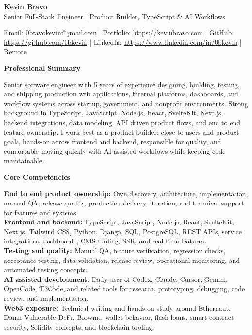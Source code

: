\documentclass[11pt]{article}
\begin{document}
\raggedright

\begin{center}
    {\LARGE \textbf{Kevin Bravo}}\\
    Senior Full-Stack Engineer | Product Builder, TypeScript \& AI Workflows \\
    \hrulefill
\end{center}

\begin{center}
    Email: \href{mailto:0bravokevin@gmail.com}{0bravokevin@gmail.com}
    | Portfolio: \href{https://kevinbravo.com}{https://kevinbravo.com}
    | GitHub: \href{https://github.com/0bkevin}{https://github.com/0bkevin}
    | LinkedIn: \href{https://www.linkedin.com/in/0bkevin/}{https://www.linkedin.com/in/0bkevin}
    | Remote
\end{center}

\vspace{4pt}
\begin{center}
    \textbf{Professional Summary}
\end{center}
\vspace{-4pt}
Senior software engineer with 5 years of experience designing, building, testing, and shipping production web applications, internal platforms, dashboards, and workflow systems across startup, government, and nonprofit environments. Strong background in TypeScript, JavaScript, Node.js, React, SvelteKit, Next.js, backend integrations, data modeling, API driven product flows, and end to end feature ownership. I work best as a product builder: close to users and product goals, hands-on across frontend and backend, responsible for quality, and comfortable moving quickly with AI assisted workflows while keeping code maintainable.

\vspace{7pt}
\begin{center}
    \textbf{Core Competencies}
\end{center}
\vspace{-4pt}
\textbf{End to end product ownership:} Own discovery, architecture, implementation, manual QA, release quality, production delivery, iteration, and technical support for features and systems. \\
\textbf{Frontend and backend:} TypeScript, JavaScript, Node.js, React, SvelteKit, Next.js, Tailwind CSS, Python, Django, SQL, PostgreSQL, REST APIs, service integrations, dashboards, CMS tooling, SSR, and real-time features. \\
\textbf{Testing and quality:} Manual QA, feature verification, regression checks, acceptance testing, data validation, release review, operational monitoring, and automated testing concepts. \\
\textbf{AI assisted development:} Daily user of Codex, Claude, Cursor, Gemini, OpenCode, T3Code, and related tools for research, prototyping, debugging, code review, and implementation. \\
\textbf{Web3 exposure:} Technical writing and hands-on study around Ethernaut, Damn Vulnerable DeFi, Brownie, wallet behavior, flash loans, smart contract security, Solidity concepts, and blockchain tooling.
\end{document}
